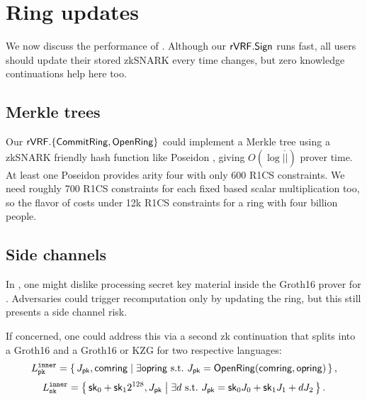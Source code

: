 \section{Ring updates}
\label{sec:ring_updates}


We now discuss the performance of \pifast.
Although our ${\mathsf{rVRF}}.{\mathsf{Sign}}$ runs fast, all users should update their
stored zkSNARK \pifast every time \ring changes, %
but zero knowledge continuations help here too.


\subsection{Merkle trees} %

Our ${\mathsf{rVRF}}.\{ {\mathsf{CommitRing}}, {\mathsf{OpenRing}} \}$ could implement a Merkle tree
using a zkSNARK friendly hash function like Poseidon \cite{poseidon},
giving $O(\log |\ring|)$ prover time.
%
At least one Poseidon \cite{poseidon} provides arity four with only
600 R1CS constraints.  We need roughly 700 R1CS constraints for each
fixed based scalar multiplication too, so the flavor of \pifast costs
under 12k R1CS constraints for a ring with four billion people.



\subsection{Side channels}
\label{subsec:rvrf_side_channel}

In \pifast, one might dislike processing secret key material inside
the Groth16 prover for \pifast.
Adversaries could trigger \pifast recomputation only by updating the ring,
but this still presents a side channel risk.

If concerned, one could address this via a second zk continuation that
splits \pifast into a Groth16 \pisk and a Groth16 or KZG \pipk for two
respective languages:
%
$$ \Lpk^\inner = \Setst{ J_\pk, \comring }{
	\exists \openring \textrm{\ s.t.\ }
	J_\pk = \eprint{\rVRF.}{}\OpenRing(\comring,\openring)
} \mathcomma \eprint{\quad\textrm{and}}{} $$ 
%
$$ \Lsk^\inner = \Setst{ \sk_0 + \sk_1 2^{128}, J_\pk }{ 
	\exists d \textrm{\ s.t.\ }
	J_\pk = \sk_0 \genJ_0 + \sk_1 \genJ_1 + d \genJ_2
} \mathperiod $$

